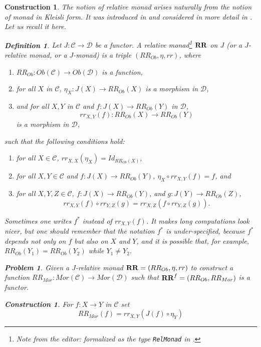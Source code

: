\documentclass[12pt]{amsart}
\newtheorem{definition}[proposition]{Definition}
\numberwithin{proposition}{subsection}
\newtheorem{problem}[proposition]{Problem}
\newtheorem{construction}[proposition]{Construction}
\newcommand{\llabel}[1]{\label{#1}}
\newcommand{\sr}{\rightarrow}
\newcommand{\RR}{{\bf RR}}
\newcommand{\C}{{\mathcal C}}
\newcommand{\D}{{\mathcal D}}
\newcommand{\editorfootnote}[1]{\footnote{Note from the editor: #1}}
\begin{document}
\begin{construction}
The notion of relative monad arises naturally from the notion of monad in Kleisli
form. It was introduced in \cite[Def.~1, p.~299]{ACU} and considered in more
detail in \cite{ACU2}. Let us recall it here.
%
\begin{definition}
\llabel{2015.12.22.def1}
Let $J:\C\sr \D$ be a functor. A {\em relative monad}\editorfootnote{formalized as the type {\tt RelMonad} in \cite{UniMath}.} $\RR$ on $J$ (or a $J$-relative monad, or a $J$-monad) is a triple $(RR_{Ob},\eta,rr)$, where
%
\begin{enumerate}
\item $RR_{Ob}:Ob(\C)\sr Ob(\D)$ is a function,
\item for all $X$ in $\C$, $\eta_{X}:J(X)\sr RR_{Ob}(X)$ is a morphism in $\D$,
\item and for all $X,Y$ in $\C$ and $f:J(X)\sr RR_{Ob}(Y)$ in $\D$,
%
$$rr_{X,Y}(f):RR_{Ob}(X)\sr RR_{Ob}(Y)$$
%
is a morphism in $\D$,
\end{enumerate}
%
such that the following conditions hold:
%
\begin{enumerate}[resume]
\item for all $X\in \C$, $rr_{X,X}(\eta_{X})=Id_{RR_{Ob}(X)}$,
\item for all $X,Y\in \C$ and $f:J(X)\sr RR_{Ob}(Y)$, $\eta_{X}\circ rr_{X,Y}(f)=f$, and
\item for all $X,Y,Z\in \C$, $f:J(X)\sr RR_{Ob}(Y)$, and $g:J(Y)\sr RR_{Ob}(Z)$, 
%
$$rr_{X,Y}(f)\circ rr_{Y,Z}(g)=rr_{X,Z}(f\circ rr_{Y,Z}(g)).$$
%
\end{enumerate}
\end{definition}
%
Sometimes one writes $f^*$ instead of $rr_{X,Y}(f)$. It makes long computations
look nicer, but one should remember that the notation $f^*$ is under-specified,
because $f^*$ depends not only on $f$ but also on $X$ and $Y$, and it is
possible that, for example, $RR_{Ob}(Y_1)=RR_{Ob}(Y_2)$ while $Y_1\ne Y_2$.
%
\begin{problem}\llabel{2016.01.15.prob1}
Given a $J$-relative monad $\RR=(RR_{Ob},\eta,rr)$ to construct a function
$RR_{Mor}:Mor(\C)\sr Mor(\D)$ such that $\RR^f=(RR_{Ob},RR_{Mor})$ is a
functor.
\end{problem}
%
\begin{construction}\rm\llabel{2016.01.15.constr1}\rm
For $f:X\sr Y$ in $\C$ set
%
\begin{equation}\llabel{2017.04.05.eq3}
RR_{Mor}(f)=rr_{X,Y}(J(f)\circ \eta_{Y})
\end{equation}%

\end{construction}
\end{construction}
\end{document}

